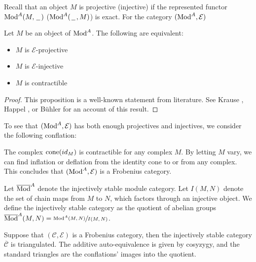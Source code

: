 \documentclass[../thesis.tex]{subfiles}
\begin{document}
            Recall that an object $M$ is projective (injective) if the represented functor $\tt{Mod}^A(M,\argument)$ ($\tt{Mod}^A(\argument,M)$) is exact. For the category $(\tt{Mod}^A, \mathcal{E})$

            \begin{proposition}
                Let $M$ be an object of $\tt{Mod}^A$. The following are equivalent:
                \begin{itemize}
                    \item $M$ is $\mathcal{E}$-projective
                    \item $M$ is $\mathcal{E}$-injective
                    \item $M$ is contractible
                \end{itemize}
            \end{proposition}

            \begin{proof}
                This proposition is a well-known statement from literature. See Krause \cite{Krause21}, Happel \cite{Happel88}, or B\"uhler \cite{Buhler10} for an account of this result.
            \end{proof}

            To see that $(\tt{Mod}^A, \mathcal{E})$ has both enough projectives and injectives, we consider the following conflation:

            \begin{center}
            \end{center}

            The complex $\tt{cone}(id_M)$ is contractible for any complex $M$. By letting $M$ vary, we can find inflation or deflation from the identity cone to or from any complex. This concludes that $(\tt{Mod}^A, \mathcal{E})$ is a Frobenius category.
            
            Let $\overline{\tt{Mod}}^A$ denote the injectively stable module category. Let $I(M, N)$ denote the set of chain maps from $M$ to $N$, which factors through an injective object. We define the injectively stable category as the quotient of abelian groups $\overline{\tt{Mod}}^A(M, N)=\sfrac{\tt{Mod}^A(M, N)}{I(M, N)}$.

            \begin{thm}
                Suppose that $(\mathcal{C},\mathcal{E})$ is a Frobenius category, then the injectively stable category $\overline{\mathcal{C}}$ is triangulated. The additive auto-equivalence is given by cosyzygy, and the standard triangles are the conflations' images into the quotient.
            \end{thm}
\end{document}
